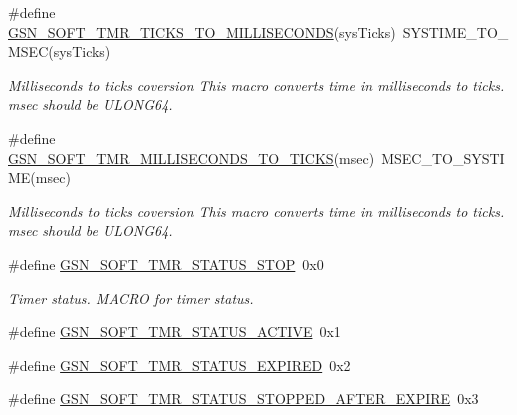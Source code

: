 \begin{DoxyCompactItemize}
\#define \hyperlink{a00673_gaf705ea28da184c29e230284fead5a65c}{GSN\_\-SOFT\_\-TMR\_\-TICKS\_\-TO\_\-MILLISECONDS}(sysTicks)~SYSTIME\_\-TO\_\-MSEC(sysTicks)
\begin{DoxyCompactList}\small\item\em Milliseconds to ticks coversion This macro converts time in milliseconds to ticks. msec should be ULONG64. \end{DoxyCompactList}\item 
\#define \hyperlink{a00673_gadf848291010b1f5e5b666443103cdb89}{GSN\_\-SOFT\_\-TMR\_\-MILLISECONDS\_\-TO\_\-TICKS}(msec)~MSEC\_\-TO\_\-SYSTIME(msec)
\begin{DoxyCompactList}\small\item\em Milliseconds to ticks coversion This macro converts time in milliseconds to ticks. msec should be ULONG64. \end{DoxyCompactList}\item 
\#define \hyperlink{a00673_ga55580feca337034720758e6ca520adb3}{GSN\_\-SOFT\_\-TMR\_\-STATUS\_\-STOP}~0x0
\begin{DoxyCompactList}\small\item\em Timer status. MACRO for timer status. \end{DoxyCompactList}\item 
\#define \hyperlink{a00586_a79c23fe59c4cb256b6e65e15f15f992a}{GSN\_\-SOFT\_\-TMR\_\-STATUS\_\-ACTIVE}~0x1
\item 
\#define \hyperlink{a00586_aa5620f9cd5903b3dba9f6e7dd428b702}{GSN\_\-SOFT\_\-TMR\_\-STATUS\_\-EXPIRED}~0x2
\item 
\#define \hyperlink{a00586_a7ab24a5e0ba5f842338cc22e0d00c5f0}{GSN\_\-SOFT\_\-TMR\_\-STATUS\_\-STOPPED\_\-AFTER\_\-EXPIRE}~0x3
\end{DoxyCompactItemize}
